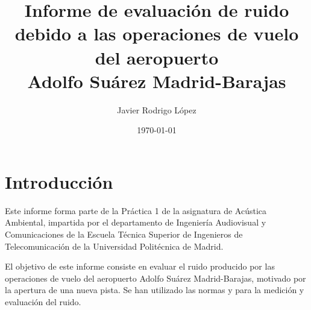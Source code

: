 \documentclass[11pt]{article}
\begin{document}
\title{\textbf{Informe de evaluación de ruido debido a las operaciones de vuelo del aeropuerto\\Adolfo Suárez Madrid-Barajas}}
\author{Javier Rodrigo López}
\date{\today}
\maketitle


{
}

\thispagestyle{firststyle}


\fancyhead{}
\pagestyle{fancy}

\pagestyle{fancy}

\setcounter{figure}{0}
\setlength{\parskip}{0.5em}

\hypersetup{
    citecolor=black,
    filecolor=black,
    linkcolor=black,
    urlcolor=blueX
}

\tableofcontents
\listoffigures


\newpage

\setcounter{page}{2}

\section{Introducción}

Este informe forma parte de la Práctica 1 de la asignatura de Acústica Ambiental, impartida por el departamento de Ingeniería Audiovisual y Comunicaciones de la Escuela Técnica Superior de Ingenieros de Telecomunicación de la Universidad Politécnica de Madrid.

El objetivo de este informe consiste en evaluar el ruido producido por las operaciones de vuelo del aeropuerto Adolfo Suárez Madrid-Barajas, motivado por la apertura de una nueva pista. Se han utilizado las normas \cite{ISO1996-2:2020} y \cite{ISO20906:2009} para la medición y evaluación del ruido.
\end{document}
